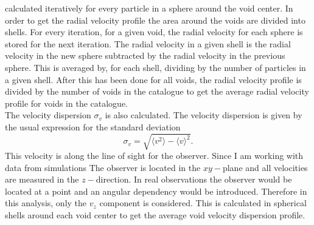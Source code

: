 calculated iteratively for every particle in a sphere around the void center. In
order to get the radial velocity profile the area around the voids are divided into
shells. For every iteration, for a given void, the radial
velocity for each sphere is stored for the next iteration. The radial velocity in a given shell
is the radial velocity in the new sphere subtracted by
the radial velocity in the previous sphere. This is averaged by, for each shell,
dividing by the number of particles in a given shell. After this has
been done for all voids, the radial velocity profile is divided by the number of voids in the catalogue to get
the average radial velocity profile for voids in the catalogue.
\\\indent
The velocity dispersion $\sigma_v$ is also calculated. The velocity dispersion
is given by the usual expression for the standard deviation
\begin{equation}\label{eq:sigma_v}
    \sigma_{v} = \sqrt{\langle v^2 \rangle - \langle v\rangle^2}.
\end{equation}
This velocity is along the line of sight for the observer. Since I am working with data from simulations
The observer is located in the $xy-$plane and all velocities are measured in the $z-$direction. In real observations
the observer would be located at a point and an angular dependency would be introduced.
Therefore in this analysis, only the $v_z$ component
is considered. This is calculated in spherical shells around each void center to
get the average void velocity dispersion profile.
